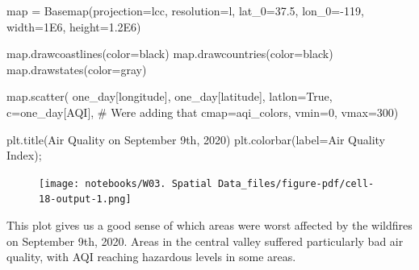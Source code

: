 \documentclass[
  letterpaper,
  DIV=11,
  numbers=noendperiod]{scrreprt}
\newenvironment{Shaded}{\begin{snugshade}}{\end{snugshade}}
\newcommand{\BuiltInTok}[1]{\textcolor[rgb]{0.00,0.23,0.31}{#1}}
\newcommand{\CommentTok}[1]{\textcolor[rgb]{0.37,0.37,0.37}{#1}}
\newcommand{\DecValTok}[1]{\textcolor[rgb]{0.68,0.00,0.00}{#1}}
\newcommand{\FloatTok}[1]{\textcolor[rgb]{0.68,0.00,0.00}{#1}}
\newcommand{\NormalTok}[1]{\textcolor[rgb]{0.00,0.23,0.31}{#1}}
\newcommand{\OperatorTok}[1]{\textcolor[rgb]{0.37,0.37,0.37}{#1}}
\newcommand{\StringTok}[1]{\textcolor[rgb]{0.13,0.47,0.30}{#1}}
\newcommand{\VariableTok}[1]{\textcolor[rgb]{0.07,0.07,0.07}{#1}}
\begin{document}
\begin{Shaded}
\begin{Highlighting}[]
\BuiltInTok{map} \OperatorTok{=}\NormalTok{ Basemap(projection}\OperatorTok{=}\StringTok{\textquotesingle{}lcc\textquotesingle{}}\NormalTok{, resolution}\OperatorTok{=}\StringTok{\textquotesingle{}l\textquotesingle{}}\NormalTok{, }
\NormalTok{            lat\_0}\OperatorTok{=}\FloatTok{37.5}\NormalTok{, lon\_0}\OperatorTok{={-}}\DecValTok{119}\NormalTok{,}
\NormalTok{            width}\OperatorTok{=}\FloatTok{1E6}\NormalTok{, height}\OperatorTok{=}\FloatTok{1.2E6}\NormalTok{)}

\BuiltInTok{map}\NormalTok{.drawcoastlines(color}\OperatorTok{=}\StringTok{\textquotesingle{}black\textquotesingle{}}\NormalTok{)}
\BuiltInTok{map}\NormalTok{.drawcountries(color}\OperatorTok{=}\StringTok{\textquotesingle{}black\textquotesingle{}}\NormalTok{)}
\BuiltInTok{map}\NormalTok{.drawstates(color}\OperatorTok{=}\StringTok{\textquotesingle{}gray\textquotesingle{}}\NormalTok{)}

\BuiltInTok{map}\NormalTok{.scatter(}
\NormalTok{      one\_day[}\StringTok{\textquotesingle{}longitude\textquotesingle{}}\NormalTok{], }
\NormalTok{      one\_day[}\StringTok{\textquotesingle{}latitude\textquotesingle{}}\NormalTok{], }
\NormalTok{      latlon}\OperatorTok{=}\VariableTok{True}\NormalTok{, }
\NormalTok{      c}\OperatorTok{=}\NormalTok{one\_day[}\StringTok{\textquotesingle{}AQI\textquotesingle{}}\NormalTok{], }\CommentTok{\# We\textquotesingle{}re adding that }
\NormalTok{      cmap}\OperatorTok{=}\NormalTok{aqi\_colors, }
\NormalTok{      vmin}\OperatorTok{=}\DecValTok{0}\NormalTok{, }
\NormalTok{      vmax}\OperatorTok{=}\DecValTok{300}\NormalTok{)}


\NormalTok{plt.title(}\StringTok{\textquotesingle{}Air Quality on September 9th, 2020\textquotesingle{}}\NormalTok{)}
\NormalTok{plt.colorbar(label}\OperatorTok{=}\StringTok{\textquotesingle{}Air Quality Index\textquotesingle{}}\NormalTok{)}\OperatorTok{;}
\end{Highlighting}
\end{Shaded}

\begin{figure}[H]

{\centering \texttt{[image: notebooks/W03. Spatial Data\_files/figure-pdf/cell-18-output-1.png]}

}

\end{figure}

This plot gives us a good sense of which areas were worst affected by
the wildfires on September 9th, 2020. Areas in the central valley
suffered particularly bad air quality, with AQI reaching hazardous
levels in some areas.
\end{document}
